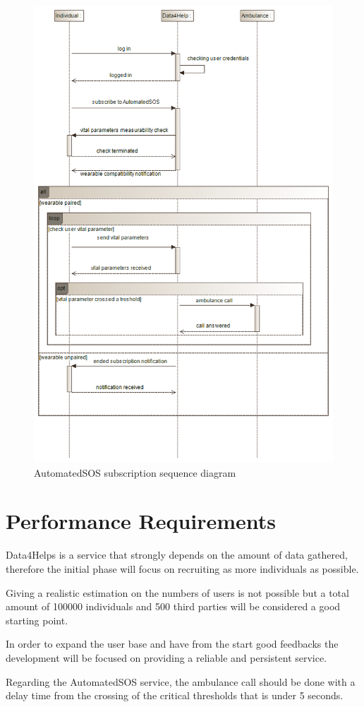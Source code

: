 \begin{figure}[H]
  \includegraphics[width=0.70\linewidth]{resources/UML/AutomatedSOSsequence.png}
  \caption{AutomatedSOS subscription sequence diagram}
  \label{fig: AutomatedSOS sequence diagram}
\end{figure}



\section{Performance Requirements}
Data4Helps is a service that strongly depends on the amount of data gathered, therefore the initial phase will focus on recruiting as more individuals as possible.

Giving a realistic estimation on the numbers of users is not possible but a total amount of 100000 individuals and 500 third parties will be considered a good starting point.

In order to expand the user base and have from the start good feedbacks the development will be focused on providing a reliable and persistent service. 

Regarding the AutomatedSOS service, the ambulance call should be done with a delay time from the crossing of the critical thresholds that is under 5 seconds.

